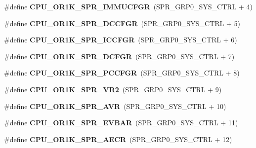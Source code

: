 \begin{DoxyCompactItemize}
\#define {\bfseries C\+P\+U\+\_\+\+O\+R1\+K\+\_\+\+S\+P\+R\+\_\+\+I\+M\+M\+U\+C\+F\+GR}~(S\+P\+R\+\_\+\+G\+R\+P0\+\_\+\+S\+Y\+S\+\_\+\+C\+T\+RL + 4)
\item 
\mbox{\label{or1k-utility_8h_a985edd21c9650b1ab71d1956938c6154}} 
\#define {\bfseries C\+P\+U\+\_\+\+O\+R1\+K\+\_\+\+S\+P\+R\+\_\+\+D\+C\+C\+F\+GR}~(S\+P\+R\+\_\+\+G\+R\+P0\+\_\+\+S\+Y\+S\+\_\+\+C\+T\+RL + 5)
\item 
\mbox{\label{or1k-utility_8h_acb19626ed074eb006774a84ae6342613}} 
\#define {\bfseries C\+P\+U\+\_\+\+O\+R1\+K\+\_\+\+S\+P\+R\+\_\+\+I\+C\+C\+F\+GR}~(S\+P\+R\+\_\+\+G\+R\+P0\+\_\+\+S\+Y\+S\+\_\+\+C\+T\+RL + 6)
\item 
\mbox{\label{or1k-utility_8h_a6850880713d3eae00176f876bf9be211}} 
\#define {\bfseries C\+P\+U\+\_\+\+O\+R1\+K\+\_\+\+S\+P\+R\+\_\+\+D\+C\+F\+GR}~(S\+P\+R\+\_\+\+G\+R\+P0\+\_\+\+S\+Y\+S\+\_\+\+C\+T\+RL + 7)
\item 
\mbox{\label{or1k-utility_8h_a57f5b01f14b8f2ded4b3bcca130462ef}} 
\#define {\bfseries C\+P\+U\+\_\+\+O\+R1\+K\+\_\+\+S\+P\+R\+\_\+\+P\+C\+C\+F\+GR}~(S\+P\+R\+\_\+\+G\+R\+P0\+\_\+\+S\+Y\+S\+\_\+\+C\+T\+RL + 8)
\item 
\mbox{\label{or1k-utility_8h_a1947b5d41bd3c5d4562e430735614015}} 
\#define {\bfseries C\+P\+U\+\_\+\+O\+R1\+K\+\_\+\+S\+P\+R\+\_\+\+V\+R2}~(S\+P\+R\+\_\+\+G\+R\+P0\+\_\+\+S\+Y\+S\+\_\+\+C\+T\+RL + 9)
\item 
\mbox{\label{or1k-utility_8h_a8ad378af173b8075339e61654adf27b3}} 
\#define {\bfseries C\+P\+U\+\_\+\+O\+R1\+K\+\_\+\+S\+P\+R\+\_\+\+A\+VR}~(S\+P\+R\+\_\+\+G\+R\+P0\+\_\+\+S\+Y\+S\+\_\+\+C\+T\+RL + 10)
\item 
\mbox{\label{or1k-utility_8h_a10399a4b515e9cd4e642b8c19c0a07f9}} 
\#define {\bfseries C\+P\+U\+\_\+\+O\+R1\+K\+\_\+\+S\+P\+R\+\_\+\+E\+V\+B\+AR}~(S\+P\+R\+\_\+\+G\+R\+P0\+\_\+\+S\+Y\+S\+\_\+\+C\+T\+RL + 11)
\item 
\mbox{\label{or1k-utility_8h_a24cd247a5c48e6fc3abd59ecdf3e07e0}} 
\#define {\bfseries C\+P\+U\+\_\+\+O\+R1\+K\+\_\+\+S\+P\+R\+\_\+\+A\+E\+CR}~(S\+P\+R\+\_\+\+G\+R\+P0\+\_\+\+S\+Y\+S\+\_\+\+C\+T\+RL + 12)

\end{DoxyCompactItemize}
